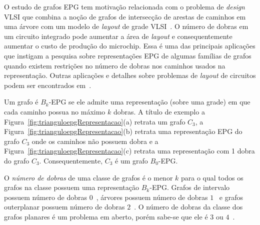 




O estudo de grafos EPG tem motivação relacionada com o problema de \textit{design} VLSI que combina a noção de grafos de intersecção de arestas de caminhos em uma árvore com um modelo de \textit{layout} de grade VLSI~\cite{golumbic2009}. O número de dobras em um circuito integrado pode aumentar a área de \textit{layout} e consequentemente aumentar o custo de produção do microchip. 
Essa é uma das principais aplicações que instigam a  pesquisa sobre representações EPG de algumas famílias de grafos quando existem restrições no número de dobras nos caminhos usados na representação.
Outras aplicações e detalhes sobre problemas de \textit{layout} de circuitos podem ser encontrados em~\cite{bandy1990, molitor1991}.   

Um grafo é $ B_k$-EPG se ele admite uma representação (sobre uma grade) em que cada caminho possua no máximo $k$ dobras. A título de exemplo a Figura~\ref{fig:trianguloepgRepresentacao}(a) retrata um grafo $C_3$, a Figura~\ref{fig:trianguloepgRepresentacao}(b) retrata uma representação EPG do grafo $C_3$ onde os caminhos não possuem dobra e a  Figura~\ref{fig:trianguloepgRepresentacao}(c) retrata uma representação com 1 dobra do grafo $C_3$. Consequentemente, $C_3$ é um grafo  $B_0$-EPG. %

O \emph{número de dobras} de uma classe de grafos é o menor  $k$ para o qual todos os grafos na classe possuem uma representação $B_k$-EPG. Grafos de intervalo possuem número de dobras $0$~\cite{golumbic2009}, árvores possuem  número de dobras $1$~\cite{golumbic2009} e  grafos outerplanar possuem número de dobras $2$~\cite{daniel2014b}. O número de dobras da classe dos grafos planares é um problema em aberto, porém sabe-se que ele é $ 3 $ ou $4$~\cite{daniel2014b}. %


